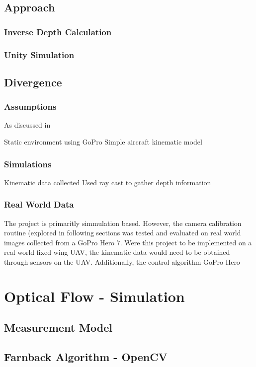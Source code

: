 \documentclass{UoNMCHA}
\numberwithin{equation}{section}
\begin{document}
\subsection{Approach}
\subsubsection{Inverse Depth Calculation}
\subsubsection{Unity Simulation}
\subsection{Divergence}
\subsubsection{Assumptions}
As discussed in 

Static environment
using GoPro
Simple aircraft kinematic model
\subsubsection{Simulations}
Kinematic data collected
Used ray cast to gather depth information
\subsubsection{Real World Data}
The project is primaritly simmulation based. However, the camera calibration routine (explored in following sections was tested and evaluated on real world images collected from a GoPro Hero 7. Were this project to be implemented on a real world fixed wing UAV, the kinematic data would need to be obtained through sensors on the UAV. Additionally, the control algorithm
GoPro Hero
\newpage
\section{Optical Flow - Simulation}
\subsection{Measurement Model}
\subsection{Farnback Algorithm - OpenCV}

\newpage
\end{document}
